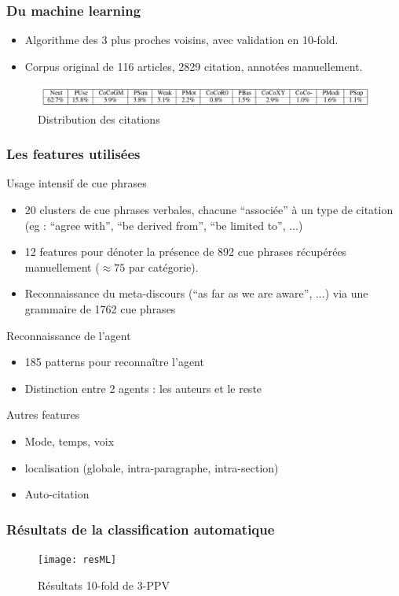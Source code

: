 \documentclass[10pt]{beamer}
\begin{document}
\begin{frame}
\frametitle{Du machine learning}
  \begin{itemize} 
  \item Algorithme des 3 plus proches voisins, avec validation en 10-fold.
  \item Corpus original de 116 articles, 2829 citation, annotées manuellement.
  \end{itemize}
  \begin{figure}[h]
    \centering
    \includegraphics[width=\textwidth]{distrib}
    \caption{Distribution des citations}
  \end{figure}
\end{frame}

\begin{frame}
  \frametitle{Les features utilisées}
  Usage intensif de cue phrases
  \begin{itemize}
  \item 20 clusters de cue phrases verbales, chacune ``associée'' à un
    type de citation (eg : ``agree with'', ``be derived from'', ``be
    limited to'', ...)
  \item 12 features pour dénoter la présence de 892 cue phrases
    récupérées manuellement ($\approx 75$ par catégorie).
  \item Reconnaissance du meta-discours (``as far as we are aware'',
    ...) via une grammaire de 1762 cue phrases
  \end{itemize}
  Reconnaissance de l'agent
    \begin{itemize}
    \item 185 patterns pour reconnaître l'agent
    \item Distinction entre 2 agents : les auteurs et le reste
    \end{itemize}
  Autres features
  \begin{itemize}
  \item Mode, temps, voix
  \item localisation (globale, intra-paragraphe,
    intra-section)
  \item Auto-citation
  \end{itemize}

\end{frame}

\begin{frame}
  \frametitle{Résultats de la classification automatique}
  \begin{figure}[h]
    \centering
    \texttt{[image: resML]}
    \caption{Résultats 10-fold de 3-PPV}
    \label{fig:resml12}
  \end{figure}
\end{frame}
\end{document}
